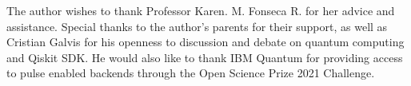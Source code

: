 The author wishes to thank Professor Karen. M. Fonseca R. for her advice and assistance. Special thanks to the author's parents for their support, as well as Cristian Galvis for his openness to discussion and debate on quantum computing and Qiskit SDK. He would also like to thank IBM Quantum for providing access to pulse enabled backends through the Open Science Prize 2021 Challenge.